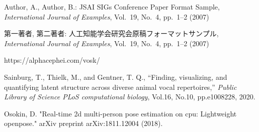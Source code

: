 \documentclass[a4j]{jarticle}
\begin{document}
\begin{thebibliography}{99}

Author, A., Author, B.:
JSAI SIGs Conference Paper Format Sample,
{\it International Journal of Examples}, Vol.~19, No.~4, pp.~1--2 (2007)

第一著者, 第二著者:
人工知能学会研究会原稿フォーマットサンプル,
{\it International Journal of Examples}, Vol.~19, No.~4, pp.~1--2 (2007)

https://alphacephei.com/vosk/


Sainburg, T., Thielk, M., and Gentner, T. Q.,
“Finding, visualizing, and quantifying latent structure across diverse animal vocal repertoires,”
{\it Public Library of Science PLoS computational biology},
Vol.16,
No.10,
pp.e1008228,
2020.

Osokin, D. "Real-time 2d multi-person pose estimation on cpu: Lightweight openpose." arXiv preprint arXiv:1811.12004 (2018).

\end{thebibliography}
\end{document}
